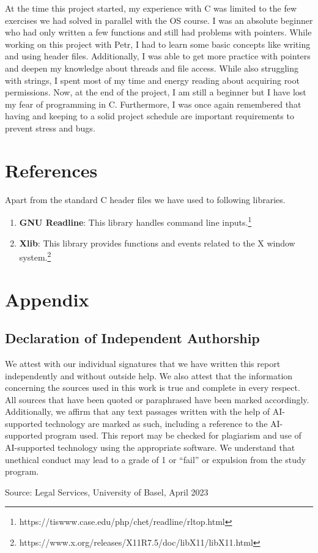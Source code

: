 \documentclass{article}
\begin{document}
At the time this project started, my experience with C was limited to the few exercises we had solved in parallel with the OS course. I was an absolute beginner who had only written a few functions and still had problems with pointers. While working on this project with Petr, I had to learn some basic concepts like writing and using header files. Additionally, I was able to get more practice with pointers and deepen my knowledge about threads and file access. While also struggling with strings, I spent most of my time and energy reading about acquiring root permissions. Now, at the end of the project, I am still a beginner but I have lost my fear of programming in C. Furthermore, I was once again remembered that having and keeping to a solid project schedule are important requirements to prevent stress and bugs. 

\section{References}

Apart from the standard C header files we have used to following libraries.

\begin{enumerate}
	\item \textbf{GNU Readline}: This library handles command line inputs.\footnote{https://tiswww.case.edu/php/chet/readline/rltop.html}
	\item \textbf{Xlib}: This library provides functions and events related to the X window system.\footnote{https://www.x.org/releases/X11R7.5/doc/libX11/libX11.html}
\end{enumerate}

\pagebreak

\section{Appendix}

\subsection{Declaration of Independent Authorship}

We attest with our individual signatures that we have written this report independently and without outside
help. We also attest that the information concerning the sources used in this work is true and complete in every
respect. All sources that have been quoted or paraphrased have been marked accordingly.
Additionally, we affirm that any text passages written with the help of AI-supported technology are marked as
such, including a reference to the AI-supported program used.
This report may be checked for plagiarism and use of AI-supported technology using the appropriate software.
We understand that unethical conduct may lead to a grade of 1 or “fail” or expulsion from the study program.

Source: Legal Services, University of Basel, April 2023
\end{document}

